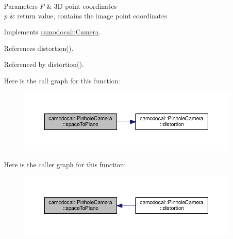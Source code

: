 \begin{DoxyParams}{Parameters}
{\em P} & 3D point coordinates \\
\hline
{\em p} & return value, contains the image point coordinates \\
\hline
\end{DoxyParams}


Implements \hyperlink{classcamodocal_1_1Camera_acf49bd1ef0919e0faf89d060dc497b52}{camodocal\+::\+Camera}.



References distortion().



Referenced by distortion().

Here is the call graph for this function\+:\nopagebreak
\begin{figure}[H]
\begin{center}
\leavevmode
\includegraphics[width=350pt]{classcamodocal_1_1PinholeCamera_a27e7b78d07e19f11d1ca0d3dc2c48b73_cgraph}
\end{center}
\end{figure}
Here is the caller graph for this function\+:\nopagebreak
\begin{figure}[H]
\begin{center}
\leavevmode
\includegraphics[width=350pt]{classcamodocal_1_1PinholeCamera_a27e7b78d07e19f11d1ca0d3dc2c48b73_icgraph}
\end{center}
\end{figure}
\mbox{\label{classcamodocal_1_1PinholeCamera_a70cc5acd48df30c2f7a2f84b35369a39}} 

